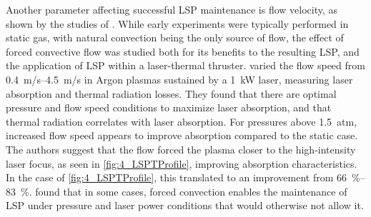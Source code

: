         Another parameter affecting successful LSP maintenance is flow velocity, as shown by the studies of \textcite{welleEnergyConversionEfficiency1986,krierContinuousWaveLaser1986,gerasimenkoLaserPlasmatron1983}. While early experiments were typically performed in static gas, with natural convection being the only source of flow, the effect of forced convective flow was studied both for its benefits to the resulting LSP, and the application of LSP within a laser-thermal thruster. \citeauthor{welleEnergyConversionEfficiency1986} varied the flow speed from \qtyrange{0.4}{4.5}{m/s} in Argon plasmas sustained by a 1~kW laser, measuring laser absorption and thermal radiation losses. They found that there are optimal pressure and flow speed conditions to maximize laser absorption, and that thermal radiation correlates with laser absorption. For pressures above 1.5~atm, increased flow speed appears to improve absorption compared to the static case. The authors suggest that the flow forced the plasma closer to the high-intensity laser focus, as seen in \autoref{fig:4_LSPTProfile}, improving absorption characteristics. In the case of \autoref{fig:4_LSPTProfile}, this translated to an improvement from \qtyrange{66}{83}{\percent}. \citeauthor{gerasimenkoLaserPlasmatron1983} found that in some cases, forced convection enables the maintenance of LSP under pressure and laser power conditions that would otherwise not allow it.

